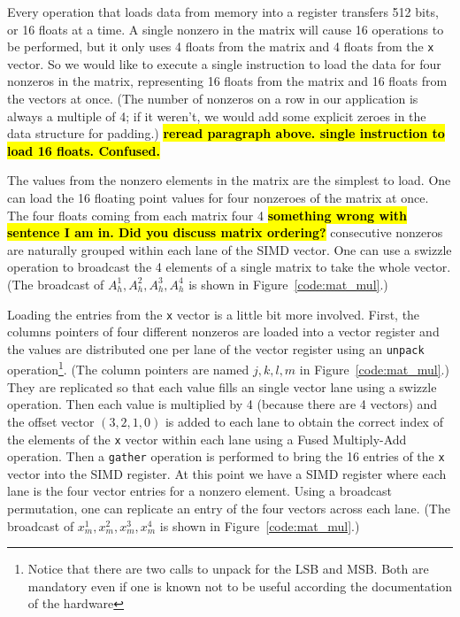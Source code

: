 \documentclass[10pt,conference,compsocconf]{IEEEtran}
\newcommand{\todo}[1]{{\color{red}\textbf{\hl{#1}}\xspace}}
\begin{document}
Every operation that loads data from memory into a register
transfers 512 bits, or 16 floats at a time. A single nonzero
in the matrix will cause 16 operations to be performed, but it only
uses 4 floats from the matrix and 4 floats from the {\tt x} vector. So
we would like to execute a single instruction to load the data for four 
nonzeros in the matrix, representing 16 floats from the matrix and 16 floats from the vectors
at once. (The number of nonzeros on a row in our application is
always a multiple of 4; if it weren't, we would add some explicit
zeroes in the data structure for padding.)
\todo{ reread paragraph above. single instruction to load 16 floats. Confused.}

The values from the nonzero elements in the matrix are the simplest to
load. One can load the 16 floating point values for four nonzeroes of
the matrix at once. The four floats coming from each matrix four 4
\todo{something wrong with sentence I am in. Did you discuss matrix ordering?}
consecutive nonzeros are naturally grouped within each lane of the
SIMD vector. One can use a swizzle operation to broadcast the 4
elements of a single matrix to take the whole vector. (The broadcast of 
$A_h^1,A_h^2,A_h^3,A_h^4$ is shown in Figure~\ref{code:mat_mul}.)

Loading the entries from the {\tt x} vector is a little bit more
involved. First, the columns pointers of four different nonzeros are
loaded into a vector register and the values are distributed one per
lane of the vector register using an {\tt unpack}
operation\footnote{Notice that there are two calls to unpack for the
  LSB and MSB. Both are mandatory even if one is known not to be
  useful according the documentation of the hardware}. (The column
pointers are named $j,k,l,m$ in Figure~\ref{code:mat_mul}.) They
are replicated so that each value fills an single vector lane 
using a swizzle operation. Then each value is multiplied by 4 
(because there are 4 vectors) 
and the offset vector $(3,2,1,0)$ is added to each lane to obtain the
correct index of the elements of the {\tt x} vector within each lane
using a Fused Multiply-Add operation. Then a {\tt gather} operation is
performed to bring the 16 entries of the {\tt x} vector into the SIMD
register. At this point we have a SIMD register where each lane is the
four vector entries for a nonzero element. Using a broadcast
permutation, one can replicate an entry of the four vectors across
each lane. (The broadcast of $x_m^1,x_m^2,x_m^3,x_m^4$ is shown in
Figure~\ref{code:mat_mul}.)
\end{document}
